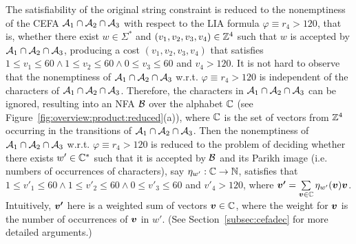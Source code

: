 The satisfiability of the original string constraint is reduced to the nonemptiness of the CEFA $\mathcal{A}_1 \cap \mathcal{A}_2 \cap \mathcal{A}_3$ with respect to the LIA formula $\varphi \equiv r_4 > 120$, that is, whether there exist $w \in \Sigma^*$ and $(v_1, v_2, v_3, v_4) \in \mathbb{Z}^4$ such that $w$ is accepted by $\mathcal{A}_1 \cap \mathcal{A}_2 \cap \mathcal{A}_3$, producing a cost $(v_1, v_2, v_3, v_4)$ that satisfies $1 \le v_1 \le 60\wedge 1 \le v_2 \le 60 \wedge 0 \le v_3 \le 60$ and $v_4 > 120$. 
It is not hard to observe that the nonemptiness of $\mathcal{A}_1 \cap \mathcal{A}_2 \cap \mathcal{A}_3$ w.r.t. $\varphi \equiv r_4 > 120$ is independent of the characters of $\mathcal{A}_1 \cap \mathcal{A}_2 \cap \mathcal{A}_3$.  Therefore, the characters in $\mathcal{A}_1 \cap \mathcal{A}_2 \cap \mathcal{A}_3$ can be ignored, resulting into an NFA $\mathcal{B}$ over the alphabet $\mathbb{C}$ (see Figure~\ref{fig:overview:product:reduced}(a)), where $\mathbb{C}$ is the set of vectors from $\mathbb{Z}^4$ occurring in the transitions of $\mathcal{A}_1 \cap \mathcal{A}_2 \cap \mathcal{A}_3$. Then the nonemptiness of $\mathcal{A}_1 \cap \mathcal{A}_2 \cap \mathcal{A}_3$ w.r.t. $\varphi \equiv r_4 > 120$ is reduced to the problem of deciding whether there exists $w' \in \mathbb{C}^*$ such that it is accepted by $\mathcal{B}$ and its Parikh image (i.e. numbers of occurrences of characters), say $\eta_{w'}: \mathbb{C} \rightarrow \mathbb{N}$, satisfies that $1 \le v'_1 \le 60\wedge 1 \le v'_2 \le 60 \wedge 0 \le v'_3 \le 60$ and $v'_4 > 120$, where $\myvec{v'} = \sum \limits_{\myvec{v} \in \costset} \eta_{w'}(\myvec{v}) \myvec{v}$. Intuitively, $\myvec{v'}$ here is a weighted sum of vectors $\myvec{v} \in \costset$, where the weight for $\myvec{v}$ is the number of occurrences of $\myvec{v}$ in $w'$. (See Section~\ref{subsec:cefadec} for more detailed arguments.)

